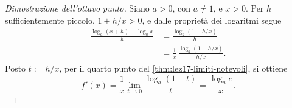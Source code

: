 \begin{proof}[Dimostrazione dell'ottavo punto]
Siano \(a>0\), con \(a\ne1\), e \(x>0\).
Per \(h\) sufficientemente piccolo,
\(1+h/x>0\), e dalle proprietà dei logaritmi segue
\[
\begin{aligned}
  \frac{\log_a(x+h)-\log_a x}{h}
  &=\frac{\log_a(1+h/x)}{h}\\
  &=\frac1x\,\frac{\log_a(1+h/x)}{h/x}.
\end{aligned}
\]
Posto \(t:=h/x\), per il quarto punto del
\cref{thm:lez17-limiti-notevoli}, si ottiene
\[
  f'(x)=\frac1x\lim_{t\to0}
    \frac{\log_a(1+t)}t=\frac{\log_a e}{x}.
\]
\end{proof}
